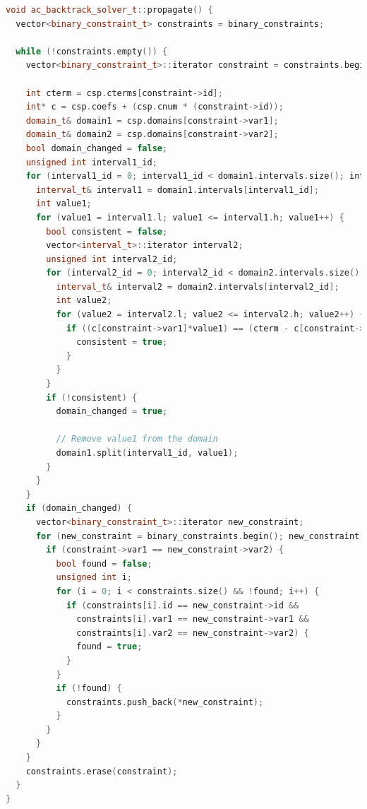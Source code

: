 \documentclass[10pt, a4paper]{article}
\begin{document}
\begin{lstlisting}[language=C++, caption=Funzione \texttt{propagate} che rende un CSP consistente sugli archi, label=lst:propagate]
void ac_backtrack_solver_t::propagate() {
  vector<binary_constraint_t> constraints = binary_constraints;
  
  while (!constraints.empty()) {
    vector<binary_constraint_t>::iterator constraint = constraints.begin();

    int cterm = csp.cterms[constraint->id];
    int* c = csp.coefs + (csp.cnum * (constraint->id));
    domain_t& domain1 = csp.domains[constraint->var1];
    domain_t& domain2 = csp.domains[constraint->var2];
    bool domain_changed = false;
    unsigned int interval1_id;
    for (interval1_id = 0; interval1_id < domain1.intervals.size(); interval1_id++) {
      interval_t& interval1 = domain1.intervals[interval1_id];
      int value1;
      for (value1 = interval1.l; value1 <= interval1.h; value1++) {
        bool consistent = false;
        vector<interval_t>::iterator interval2;
        unsigned int interval2_id;
        for (interval2_id = 0; interval2_id < domain2.intervals.size() && !consistent; interval2_id++) {
          interval_t& interval2 = domain2.intervals[interval2_id];
          int value2;
          for (value2 = interval2.l; value2 <= interval2.h; value2++) {
            if ((c[constraint->var1]*value1) == (cterm - c[constraint->var2]*value2)) {
              consistent = true;
            }
          }
        }
        if (!consistent) {
          domain_changed = true;

          // Remove value1 from the domain
          domain1.split(interval1_id, value1);
        }            
      }   
    }
    if (domain_changed) {
      vector<binary_constraint_t>::iterator new_constraint;
      for (new_constraint = binary_constraints.begin(); new_constraint != binary_constraints.end(); new_constraint++) {
        if (constraint->var1 == new_constraint->var2) {
          bool found = false;
          unsigned int i;
          for (i = 0; i < constraints.size() && !found; i++) {
            if (constraints[i].id == new_constraint->id && 
              constraints[i].var1 == new_constraint->var1 && 
              constraints[i].var2 == new_constraint->var2) {
              found = true;
            }
          }
          if (!found) { 
            constraints.push_back(*new_constraint); 
          }
        }
      }
    }
    constraints.erase(constraint);        
  }
}
\end{lstlisting}
\end{document}
